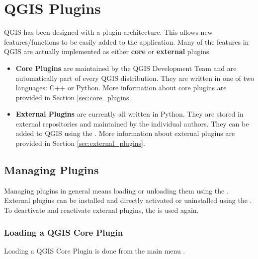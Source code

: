 
\chapter{QGIS Plugins}\label{sec:plugins}


QGIS has been designed with a plugin architecture.
This allows new features/functions to be easily added to the application.
Many of the features in QGIS are actually implemented as either \textbf{core}
or \textbf{external} plugins.

\begin{itemize}[label=--]
\item \textbf{Core Plugins} are maintained by the QGIS Development
Team and are automatically part of every QGIS distribution.
They are written in one of two languages: C++ or Python.
More information about core plugins are provided in Section \ref{sec:core_plugins}.
\item \textbf{External Plugins} are currently all written in Python.
They are stored in external repositories and maintained by the individual authors.
They can be added to QGIS using the .
More information about external plugins are provided in Section \ref{sec:external_plugins}.
\end{itemize}

\section{Managing Plugins}\label{sec:managing_plugins}

Managing plugins in general means loading or unloading them using
the . External plugins can be installed and
directly activated or uninstalled using the . To deactivate and reactivate external plugins, the
 is used again.

\subsection{Loading a QGIS Core Plugin}\label{sec:load_core_plugin}

Loading a QGIS Core Plugin is done from the main menu 
\arrow {}.

